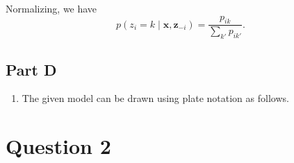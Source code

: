 \documentclass[12pt]{article}
\begin{document}
\begin{enumerate}[label=(\alph*), resume]
    Normalizing, we have \[
        \boxed{
            p(z_i = k \mid \bm{x}, \bm{z}_{-i})
                = \frac{p_{ik}}{\sum_{k'} p_{ik'}}.
        }
    \]
\end{enumerate}


\subsection*{Part D}
\begin{enumerate}[label=(\alph*), resume]
    \item The given model can be drawn using plate notation as follows.
\end{enumerate}




\clearpage
\section*{Question 2}
\end{document}
